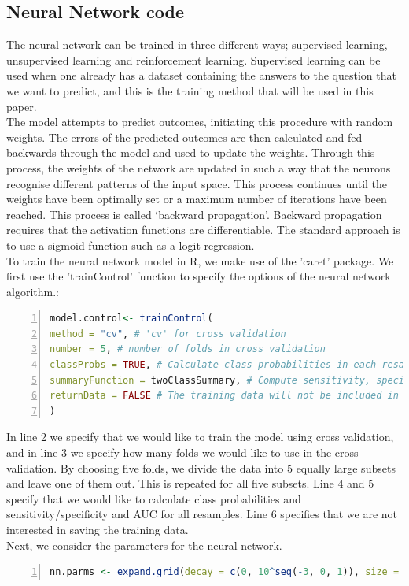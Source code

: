     \subsection{Neural Network code}
   \noindent The neural network can be trained in three different ways; supervised learning, unsupervised learning and reinforcement learning. Supervised learning can be used when one already has a dataset containing the answers to the question that we want to predict, and this is the training method that will be used in this paper.\\
   The model attempts to predict outcomes, initiating this procedure with random weights. The errors of the predicted outcomes are then calculated and fed backwards through the model and used to update the weights. Through this process, the weights of the network are updated in such a way that the neurons recognise different patterns of the input space. This process continues until the weights have been optimally set or a maximum number of iterations have been reached. This process is called ‘backward propagation’. Backward propagation requires that the activation functions are differentiable. The standard approach is to use a sigmoid function such as a logit regression.\\
   [\baselineskip]\indent To train the neural network model in R, we make use of the 'caret' package. We first use the 'trainControl' function to specify the options of the neural network algorithm.: 
   \begin{lstlisting}[language=R,numbers=left, numberstyle=\normalsize]
model.control<- trainControl(
method = "cv", # 'cv' for cross validation
number = 5, # number of folds in cross validation
classProbs = TRUE, # Calculate class probabilities in each resample
summaryFunction = twoClassSummary, # Compute sensitivity, specificity and AUC for each resample
returnData = FALSE # The training data will not be included in the ouput training object
)
   \end{lstlisting}
   \indent In line 2 we specify that we would like to train the model using cross validation, and in line 3 we specify how many folds we would like to use in the cross validation. By choosing five folds, we divide the data into 5 equally large subsets and leave one of them out. This is repeated for all five subsets. Line 4 and 5 specify that we would like to calculate class probabilities and sensitivity/specificity and AUC for all resamples. Line 6 specifies that we are not interested in saving the training data.\\
   Next, we consider the parameters for the neural network.
    \begin{lstlisting}[language=R,numbers=left, numberstyle=\normalsize]
     nn.parms <- expand.grid(decay = c(0, 10^seq(-3, 0, 1)), size = seq(3,15,1))
   \end{lstlisting}
   
